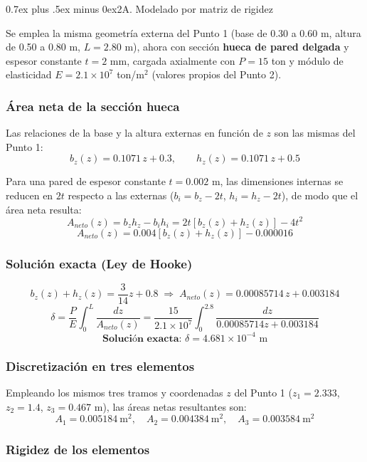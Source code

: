 \documentclass[conference]{IEEEtran}
\makeatletter
\def\subsection{\@startsection{subsection}{2}{\z@}{1.5ex plus 1.5ex minus 0.5ex}%
{0.7ex plus .5ex minus 0ex}{\normalfont\normalsize\bfseries}}%
\makeatother
\begin{document}
\subsection{2A. Modelado por matriz de rigidez}

Se emplea la misma geometría externa del Punto 1 (base de 0.30 a 0.60 m, altura de 0.50 a 0.80 m, $L=2.80$ m), ahora con sección \textbf{hueca de pared delgada} y espesor constante $t=2$ mm, cargada axialmente con $P=15$ ton y módulo de elasticidad $E=2.1\times10^{7}$ ton/m$^2$ (valores propios del Punto 2).

\subsubsection*{Área neta de la sección hueca}

Las relaciones de la base y la altura externas en función de $z$ son las mismas del Punto 1:
\[
b_z(z)=0.1071\,z+0.3,\qquad h_z(z)=0.1071\,z+0.5
\]

Para una pared de espesor constante $t=0.002$ m, las dimensiones internas se reducen en $2t$ respecto a las externas ($b_i=b_z-2t$, $h_i=h_z-2t$), de modo que el área neta resulta:
\[
A_{neto}(z)=b_z h_z-b_i h_i = 2t\left[b_z(z)+h_z(z)\right]-4t^2
\]
\[
A_{neto}(z)=0.004\left[b_z(z)+h_z(z)\right]-0.000016
\]

\subsubsection*{Solución exacta (Ley de Hooke)}

\[
b_z(z)+h_z(z)=\frac{3}{14}z+0.8 \;\Rightarrow\; A_{neto}(z)=0.00085714\,z+0.003184
\]
\[
\delta=\frac{P}{E}\int_0^{L}\frac{dz}{A_{neto}(z)}=\frac{15}{2.1\times10^{7}}\int_0^{2.8}\frac{dz}{0.00085714z+0.003184}
\]
\[
\textbf{Solución exacta: } \delta = 4.681\times10^{-4}\text{ m}
\]

\subsubsection*{Discretización en tres elementos}

Empleando los mismos tres tramos y coordenadas $z$ del Punto 1 ($z_1=2.333$, $z_2=1.4$, $z_3=0.467$ m), las áreas netas resultantes son:
\[
A_1=0.005184\ \text{m}^2,\quad A_2=0.004384\ \text{m}^2,\quad A_3=0.003584\ \text{m}^2
\]

\subsubsection*{Rigidez de los elementos}
\end{document}
